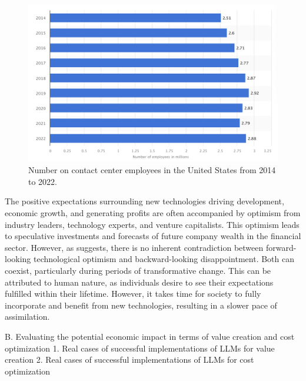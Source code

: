 \documentclass[preprint, 3p,
authoryear]{elsarticle} %
\begin{document}
\begin{figure}

{\centering \includegraphics[width=0.7\linewidth]{../Views/contact_center_employees_US} 

}

\caption{\label{fig1}Number on contact center employees in the United States from 2014 to 2022.}\label{fig:fig1}
\end{figure}

The positive expectations surrounding new technologies driving
development, economic growth, and generating profits are often
accompanied by optimism from industry leaders, technology experts, and
venture capitalists. This optimism leads to speculative investments and
forecasts of future company wealth in the financial sector. However, as
\citep{paradox} suggests, there is no inherent contradiction between
forward-looking technological optimism and backward-looking
disappointment. Both can coexist, particularly during periods of
transformative change. This can be attributed to human nature, as
individuals desire to see their expectations fulfilled within their
lifetime. However, it takes time for society to fully incorporate and
benefit from new technologies, resulting in a slower pace of
assimilation.

B. Evaluating the potential economic impact in terms of value creation
and cost optimization 1. Real cases of successful implementations of
LLMs for value creation 2. Real cases of successful implementations of
LLMs for cost optimization
\end{document}
